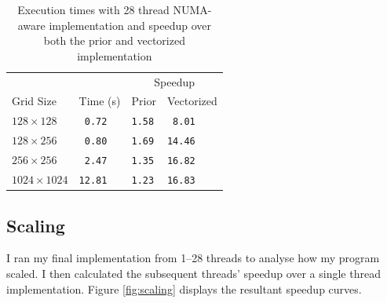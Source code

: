 \documentclass[twocolumn, a4paper]{article}
\begin{document}
\begin{table}[htbp]
  \begin{center}
  \caption{Execution times with 28 thread NUMA-aware implementation and speedup over both the prior and vectorized implementation}\label{tab:numa}
  \begin{tabular}[t]{l | l  l  l} 
      \hline\hline
      &&\multicolumn{2}{c}{Speedup}\\
      \cline{3-4}
      Grid Size&Time (s)&Prior&Vectorized\\
      \hline
      $128 \times 128$&\texttt{ 0.72}&\texttt{1.58}&\texttt{ 8.01}\\
      $128 \times 256$&\texttt{ 0.80}&\texttt{1.69}&\texttt{14.46}\\
      $256 \times 256$&\texttt{ 2.47}&\texttt{1.35}&\texttt{16.82}\\
      $1024 \times 1024$&\texttt{12.81}&\texttt{1.23}&\texttt{16.83}\\
      \hline
    \end{tabular}
  \end{center}
\end{table}

\subsection{Scaling}

I ran my final implementation from 1--28 threads to analyse how my program scaled.
I then calculated the subsequent threads' speedup over a single thread implementation.
Figure \ref{fig:scaling} displays the resultant speedup curves.
\end{document}

